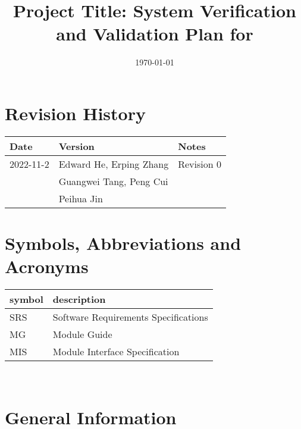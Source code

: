 \documentclass[12pt, titlepage]{article}
\begin{document}
\title{Project Title: System Verification and Validation Plan for \progname{}} 
\author{\authname}
\date{\today}
	
\maketitle


\section{Revision History}

\begin{tabularx}{\textwidth}{p{3cm}p{3cm}X}
\toprule {\bf Date} & {\bf Version} & {\bf Notes}\\
\midrule
2022-11-2 & Edward He, Erping Zhang & Revision 0\\
& Guangwei Tang, Peng Cui & \\
& Peihua Jin & \\
\bottomrule
\end{tabularx}

\newpage

\tableofcontents

\listoftables


\newpage

\section{Symbols, Abbreviations and Acronyms}

\renewcommand{\arraystretch}{1.2}
\begin{tabular}{l l} 
  \toprule		
  \textbf{symbol} & \textbf{description}\\
  \midrule 
  SRS & Software Requirements Specifications\\
  MG & Module Guide\\
  MIS & Module Interface Specification\\
  \bottomrule
\end{tabular}\\



\newpage



\section{General Information}
\end{document}
